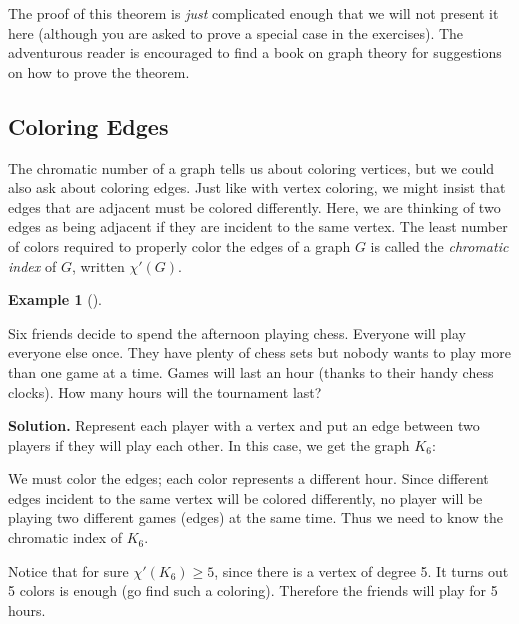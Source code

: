 \documentclass[10pt,]{book}
\theoremstyle{plain}
\theoremstyle{definition}
\newtheorem{example}[theorem]{Example}
\theoremstyle{definition}
\theoremstyle{definition}
\numberwithin{equation}{chapter}
\newcommand{\vtx}[2]{node[fill,circle,inner sep=0pt, minimum size=4pt,label=#1:#2]{}}
\renewcommand{\v}{\vtx{above}{}}
\begin{document}
The proof of this theorem is \emph{just} complicated enough that we will not present it here (although you are asked to prove a special case in the exercises). The adventurous reader is encouraged to find a book on graph theory for suggestions on how to prove the theorem.
%
\typeout{************************************************}
\typeout{************************************************}
\subsection[Coloring Edges]{Coloring Edges}\label{subsection-40}

The chromatic number of a graph tells us about coloring vertices, but we could also ask about coloring edges. Just like with vertex coloring, we might insist that edges that are adjacent must be colored differently. Here, we are thinking of two edges as being adjacent if they are incident to the same vertex. The least number of colors required to properly color the edges of a graph \(G\) is called the \emph{chromatic index} of \(G\), written \(\chi'(G)\).
%
\begin{example}[]\label{example-107}

Six friends decide to spend the afternoon playing chess. Everyone will play everyone else once. They have plenty of chess sets but nobody wants to play more than one game at a time. Games will last an hour (thanks to their handy chess clocks). How many hours will the tournament last?
%
\par\medskip\noindent%
\textbf{Solution.}\quad
Represent each player with a vertex and put an edge between two players if they will play each other. In this case, we get the graph \(K_6\):
%
\leavevmode%
\begin{figure}
\centering
{
}
\end{figure}
\par

We must color the edges; each color represents a different hour. Since different edges incident to the same vertex will be colored differently, no player will be playing two different games (edges) at the same time. Thus we need to know the chromatic index of \(K_6\).
%
\par

Notice that for sure \(\chi'(K_6) \ge 5\), since there is a vertex of degree 5. It turns out 5 colors is enough (go find such a coloring). Therefore the friends will play for 5 hours.
%
\end{example}
\par
\end{document}
